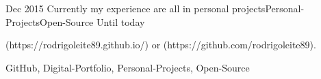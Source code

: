  
\begin{experiences}
	
		
 \experience
    {Dec 2015}   {Currently my experience are all in personal projects}{Personal-Projects}{Open-Source}
    {Until today} {
                      \begin{itemize}
                        (https://rodrigoleite89.github.io/) or (https://github.com/rodrigoleite89).            
                      \end{itemize}
                    }
                    {GitHub, Digital-Portfolio, Personal-Projects, Open-Source}
  \emptySeparator
 \end{experiences}